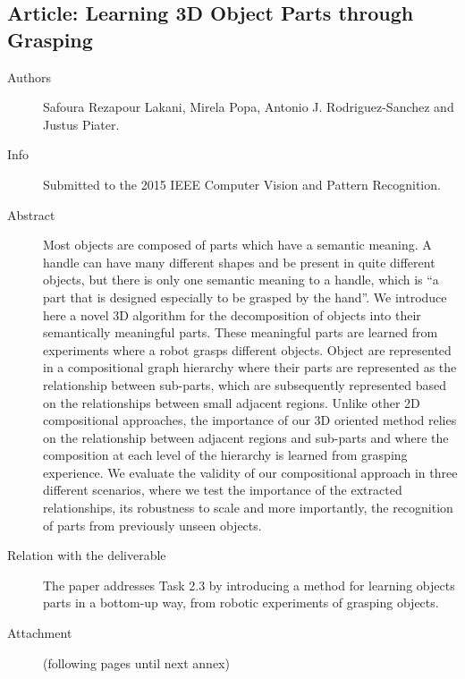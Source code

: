 \documentclass[a4paper,11pt,pdf]{pacmanreport}
\begin{document}
\subsection{Article: Learning 3D Object Parts through Grasping} \label{ann:icra}
\begin{description}
	\item[Authors] Safoura Rezapour Lakani, Mirela Popa, Antonio J. Rodriguez-Sanchez and Justus Piater.
	\item[Info] Submitted to the 2015 IEEE Computer Vision and Pattern Recognition. 
	\item[Abstract] Most objects are composed of parts which have a semantic meaning. A handle can have many different shapes and be present in quite different objects, but there is only one semantic meaning to a handle, which is ``a part that is designed especially to be grasped by the hand''. We introduce here a novel 3D algorithm for the decomposition of objects into their semantically meaningful parts. These meaningful parts are learned from experiments where a robot grasps different objects. Object are represented in a compositional graph hierarchy where their parts are represented as the relationship between sub-parts, which are subsequently represented based on the relationships between small adjacent regions. Unlike other 2D compositional approaches, the importance of our 3D oriented method relies on the relationship between adjacent regions and sub-parts and where the composition at each level of the hierarchy is learned from grasping experience. We evaluate the validity of our compositional approach in three different scenarios, where we test the importance of the extracted relationships, its robustness to scale and more importantly, the recognition of parts from previously unseen objects.
	\item[Relation with the deliverable] The paper addresses Task 2.3 by introducing a method for learning objects parts in a bottom-up way, from robotic experiments of grasping objects.
    \item[Attachment] (following pages until next annex)
\end{description}

\end{document}
